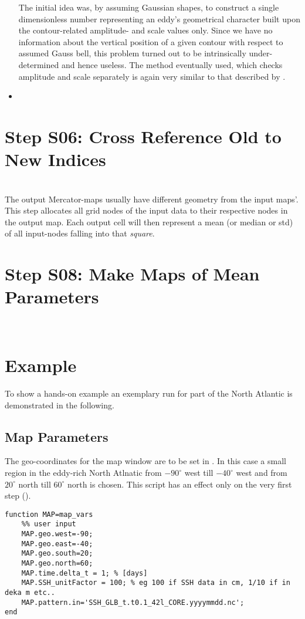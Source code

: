\begin{itemize}
\begin{wrapfigure}{r}{0.4\textwidth}
	\label{fig:scat-ID-dist-IQ}
\end{wrapfigure}
	The initial idea was, by assuming Gaussian shapes, to construct a single dimensionless number representing an eddy's geometrical character built upon the contour-related amplitude- and scale values only. Since we have no information about the vertical position of a given contour with respect to assumed Gauss bell, this problem turned out to be intrinsically under-determined and hence useless. The method eventually used, which checks amplitude and scale separately is again very similar to that described by \cite{chelton2011}.
  \item

\end{itemize}

\section{Step S06: Cross Reference Old to New Indices}
\\
The output Mercator-maps usually have different geometry from the input maps'.
This step allocates all grid nodes of the input data
to their respective nodes in the output map. Each output cell will then represent a mean (or median or std) of all input-nodes falling into that \textit{square}.

\section{Step S08: Make Maps of Mean Parameters}
\\


\section{Example}
To show a hands-on example an exemplary run for part of the North Atlantic is
demonstrated in the following.
\subsection{Map Parameters} \label{codeEx:map_params}
The geo-coordinates for the map window are to be set in .
In this case a small region in the eddy-rich North Atlnatic from $-90^\circ$
west till $-40^\circ$ west and from $20^\circ$ north till $60^\circ$ north is
chosen. This script has an effect only on the very first step ().
\begin{lstlisting}
function MAP=map_vars
	%% user input
	MAP.geo.west=-90;
	MAP.geo.east=-40;
	MAP.geo.south=20;
	MAP.geo.north=60;
	MAP.time.delta_t = 1; % [days]
	MAP.SSH_unitFactor = 100; % eg 100 if SSH data in cm, 1/10 if in deka m etc..
	MAP.pattern.in='SSH_GLB_t.t0.1_42l_CORE.yyyymmdd.nc';
end
\end{lstlisting}
